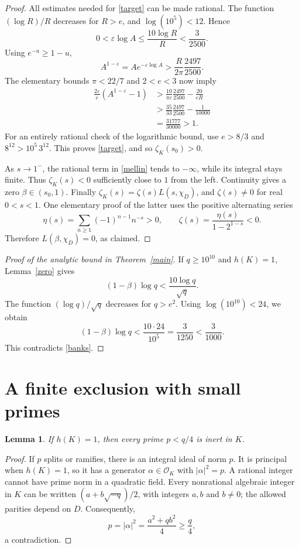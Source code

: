 \documentclass[11pt]{article}
\newtheorem{lemma}[theorem]{Lemma}
\newcommand{\OK}{\mathcal O_K}
\newcommand{\zK}{\zeta_K}
\newcommand{\norm}[1]{\lvert #1\rvert}
\begin{document}
\begin{proof}
All estimates needed for \eqref{target} can be made rational.
The function \((\log R)/R\) decreases for \(R>e\), and
\(\log(10^5)<12\). Hence
\[
 0<\varepsilon\log A
 \le\frac{10\log R}{R}<\frac{3}{2500}.
\]
Using \(e^{-u}\ge1-u\),
\[
 A^{1-\varepsilon}
   = A e^{-\varepsilon\log A}
   >\frac{R}{2\pi}\frac{2497}{2500}.
\]
The elementary bounds \(\pi<22/7\) and \(2<e<3\) now imply
\begin{align*}
 \frac{2\varepsilon}{e}(A^{1-\varepsilon}-1)
 &>\frac{10}{\pi e}\frac{2497}{2500}-\frac{20}{eR}\\
 &>\frac{35}{33}\frac{2497}{2500}-\frac{1}{10000}\\
 &=\frac{31777}{30000}>1.
\end{align*}
For an entirely rational check of the logarithmic bound, use
\(e>8/3\) and \(8^{12}>10^5\,3^{12}\).
This proves \eqref{target}, and so \(\zK(s_0)>0\).

As \(s\to1^-\), the rational term in \eqref{mellin} tends to
\(-\infty\), while its integral stays finite. Thus \(\zK(s)<0\)
sufficiently close to \(1\) from the left.
Continuity gives a zero \(\beta\in(s_0,1)\).
Finally \(\zK(s)=\zeta(s)L(s,\chi_D)\), and \(\zeta(s)\ne0\) for
real \(0<s<1\). One elementary proof of the latter uses the positive
alternating series
\[
 \eta(s)=\sum_{n\ge1}(-1)^{n-1}n^{-s}>0,\qquad
 \zeta(s)=\frac{\eta(s)}{1-2^{1-s}}<0.
\]
Therefore \(L(\beta,\chi_D)=0\), as claimed.
\end{proof}

\begin{proof}[Proof of the analytic bound in Theorem~\ref{main}]
If \(q\ge10^{10}\) and \(h(K)=1\), Lemma~\ref{zero} gives
\[
 (1-\beta)\log q < \frac{10\log q}{\sqrt q}.
\]
The function \((\log q)/\sqrt q\) decreases for \(q>e^2\).
Using \(\log(10^{10})<24\), we obtain
\[
 (1-\beta)\log q
 < \frac{10\cdot24}{10^5}
 =\frac{3}{1250}<\frac{3}{1000}.
\]
This contradicts \eqref{banks}.
\end{proof}

\section{A finite exclusion with small primes}\label{finite}

\begin{lemma}\label{inert}
If \(h(K)=1\), then every prime \(p<q/4\) is inert in \(K\).
\end{lemma}
\begin{proof}
If \(p\) splits or ramifies, there is an integral ideal of norm \(p\).
It is principal when \(h(K)=1\), so it has a generator
\(\alpha\in\OK\) with \(\norm{\alpha}^2=p\).
A rational integer cannot have prime norm in a quadratic field.
Every nonrational algebraic integer in \(K\) can be written
\((a+b\sqrt{-q})/2\), with integers \(a,b\) and \(b\ne0\);
the allowed parities depend on \(D\).
Consequently,
\[
 p=\norm{\alpha}^2=\frac{a^2+qb^2}{4}\ge\frac q4,
\]
a contradiction.
\end{proof}
\end{document}
